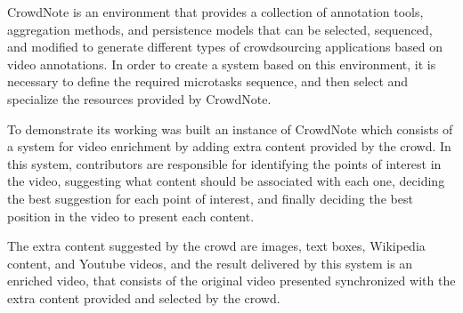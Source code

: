
CrowdNote is an environment that provides a collection of annotation tools, aggregation methods, and persistence models that can be selected, sequenced, and modified to generate different types of crowdsourcing applications based on video annotations. In order to create a system based on this environment, it is necessary to define the required microtasks sequence, and then select and specialize the resources provided by CrowdNote.


To demonstrate its working was built an instance of CrowdNote which consists of a system for video enrichment by adding extra content provided by the crowd. In this system, contributors are responsible for identifying the points of interest in the video, suggesting what content should be associated with each one, deciding the best suggestion for each point of interest, and finally deciding the best position in the video to present each content.


The extra content suggested by the crowd are images, text boxes, Wikipedia content, and Youtube videos, and the result delivered by this system is an enriched video, that consists of the original video presented synchronized with the extra content provided and selected by the crowd.


